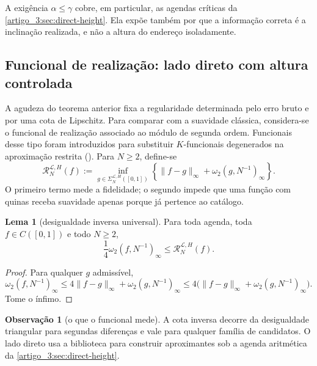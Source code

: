 \documentclass[12pt,a4paper]{article}
\makeatletter
\theoremstyle{preciso}
\theoremstyle{definition}
\newcommand{\Library}{\mathcal{L}}
\theoremstyle{preciso}
\theoremstyle{preciso}
\newtheorem{lemma}[teorema]{Lema}
\theoremstyle{preciso}
\theoremstyle{preciso}
\theoremstyle{definition}
\theoremstyle{preciso}
\theoremstyle{definition}
\newtheorem{remark}[teorema]{Observação}
\theoremstyle{preciso}
\theoremstyle{preciso}
\theoremstyle{definition}
\newcommand{\abntlookup}[2]{\ifcsname ab#1@#2\endcsname\csname ab#1@#2\endcsname\else\textbf{??}\PackageWarning{abnt}{Citacao indefinida: #2}\fi}
\newcommand{\abntpar}[1]{\hyperlink{bib:#1}{\abntlookup{U}{#1}, \abntlookup{Y}{#1}}}
\newcommand{\abntsep}{}
\newcommand{\abntpitem}[1]{\abntsep\renewcommand{\abntsep}{; }\abntpar{#1}}
\newcommand{\citep}[2][]{\begingroup\renewcommand{\abntsep}{}(\forcsvlist{\abntpitem}{#2}\ifblank{#1}{}{, #1})\endgroup}
\makeatother
\begin{document}
A exigência $\alpha\le\gamma$ cobre, em particular, as agendas críticas da
\cref{artigo_3:sec:direct-height}. Ela expõe também por que a informação correta é a inclinação
realizada, e não a altura do endereço isoladamente.

\subsection{Funcional de realização: lado direto com altura controlada}

A agudeza do teorema anterior fixa a regularidade determinada pelo erro bruto
e por uma cota de Lipschitz. Para comparar com a suavidade clássica, considera-se
o funcional de realização associado ao módulo de segunda ordem. Funcionais
desse tipo foram introduzidos para substituir $K$-funcionais degenerados na
aproximação restrita \citep{artigo_2-hristovivanov1990}. Para $N\ge2$, define-se
\begin{equation}
 \mathcal R_N^{\Library,H}(f)
 :=\inf_{g\in\Sigma_N^{\Library,H}([0,1])}
 \left\{\|f-g\|_\infty+
 \omega_2(g,N^{-1})_\infty\right\}.
 \label{artigo_3:eq:self-roughness-certificate}
\end{equation}
O primeiro termo mede a fidelidade; o segundo impede que uma função com quinas
receba suavidade apenas porque já pertence ao catálogo.

\begin{lemma}[desigualdade inversa universal]\label{map:artigo_3:5.10}
\label{artigo_3:lem:universal-regularized-inverse}
Para toda agenda, toda $f\in C([0,1])$ e todo $N\ge2$,
\begin{equation}
 \frac14\omega_2(f,N^{-1})_\infty
 \le \mathcal R_N^{\Library,H}(f).
 \label{artigo_3:eq:universal-regularized-lower}
\end{equation}
\end{lemma}

\begin{proof}
Para qualquer $g$ admissível,
\[
 \omega_2(f,N^{-1})_\infty
 \le4\|f-g\|_\infty+\omega_2(g,N^{-1})_\infty
 \le4\bigl(\|f-g\|_\infty+\omega_2(g,N^{-1})_\infty\bigr).
\]
Tome o ínfimo.
\end{proof}

\begin{remark}[o que o funcional mede]\label{map:artigo_3:5.11}
\label{artigo_3:rem:realization-functional-scope}
A cota inversa decorre da desigualdade triangular para segundas diferenças e vale para qualquer família de candidatos. O lado direto usa a biblioteca para construir aproximantes sob a agenda aritmética da \cref{artigo_3:sec:direct-height}.
\end{remark}
\end{document}
